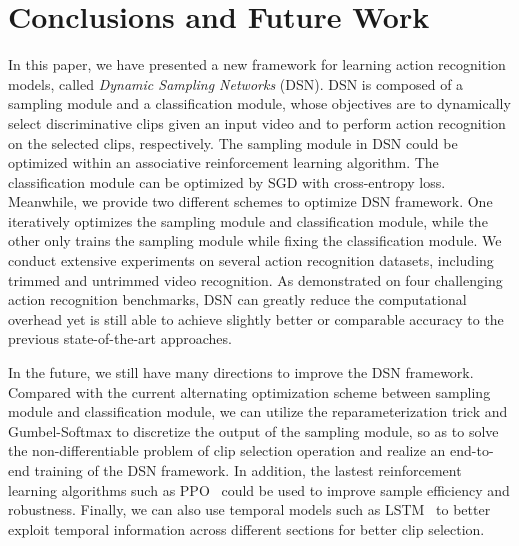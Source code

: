 \documentclass[journal]{IEEEtran}
\begin{document}
\section{Conclusions and Future Work}
\label{sec:con}
In this paper, we have presented a new framework for learning action recognition models, called {\em Dynamic Sampling Networks} (DSN).
DSN is composed of a sampling module and a classification module, whose objectives are to dynamically select discriminative clips given an input video and to perform action recognition on the selected clips, respectively.
The sampling module in DSN could be optimized within an associative reinforcement learning algorithm.
The classification module can be optimized by SGD with cross-entropy loss.
Meanwhile, we provide two different schemes to optimize DSN framework.
One iteratively optimizes the sampling module and classification module, while the other only trains the sampling module while fixing the classification module.
We conduct extensive experiments on several action recognition datasets, including trimmed and untrimmed video recognition.
As demonstrated on four challenging action recognition benchmarks, DSN can greatly reduce the computational overhead yet is still able to achieve slightly better or comparable accuracy to the previous state-of-the-art approaches.

In the future, we still have many directions to improve the DSN framework.
Compared with the current alternating optimization scheme between sampling module and classification module, we can utilize the reparameterization trick and Gumbel-Softmax to discretize the output of the sampling module, so as to solve the non-differentiable problem of clip selection operation and realize an end-to-end training of the DSN framework.
In addition, the lastest reinforcement learning algorithms such as PPO~\cite{ppo} could be used to improve sample efficiency and robustness.
Finally, we can also use temporal models such as LSTM~\cite{lstm} to better exploit temporal information across different sections for better clip selection.














\ifCLASSOPTIONcaptionsoff
  \newpage
\fi












\end{document}
